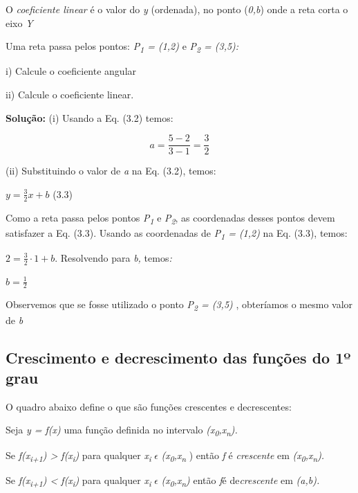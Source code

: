 \begin{caixa}
O \textit{coeficiente linear} é o valor do \textit{y }(ordenada), no ponto (\textit{0,b}) onde a reta corta o eixo \textit{Y}  
\end{caixa}

\begin{texemplo}
Uma reta passa pelos pontos: \textit{P\textsubscript{1} = (1,2) }e\textit{ P\textsubscript{2} = (3,5):}

i) Calcule o coeficiente angular

ii) Calcule o coeficiente linear.

\textbf{Solução: }(i) Usando a Eq. (3.2) temos:

 \[ a=\frac{5-2}{3-1}=\frac{3}{2} \] 

(ii) Substituindo o valor de \textit{a} na Eq. (3.2), temos:

 \( y=\frac{3}{2}x+b \) \tab (3.3)

Como a reta passa pelos pontos \textit{P\textsubscript{1 }}e\textit{ P\textsubscript{2}}, as coordenadas desses pontos devem satisfazer a Eq. (3.3). Usando as coordenadas de\textit{ P\textsubscript{1} = (1,2) }na Eq. (3.3), temos:

\textit{\( 2=\frac{3}{2} \cdot 1+b \)}. Resolvendo para\textit{ b, }temos\textit{:}

\( b=\frac{1}{2} \)  

Observemos que se fosse utilizado o ponto \textit{P\textsubscript{2} = (3,5)} , obteríamos o mesmo valor de \textit{b}  \qedsymbol{}
\end{texemplo}

\subsection{Crescimento e decrescimento das funções do 1º grau}

O quadro abaixo define o que são funções crescentes e decrescentes:

\begin{caixa}
Seja \textit{y = f(x)} uma função definida no intervalo \textit{(x\textsubscript{0},x\textsubscript{n}).} 

Se \textit{f(x\textsubscript{i+1}) > f(x\textsubscript{i})} para qualquer \textit{x\textsubscript{i }} $ \epsilon $  \textit{(x\textsubscript{0},x\textsubscript{n}} ) então \textit{f} é \textit{crescente} em \textit{(x\textsubscript{0},x\textsubscript{n}).}

Se \textit{f(x\textsubscript{i+1}) <  f(x\textsubscript{i})} para qualquer \textit{x\textsubscript{i }} $ \epsilon $  \textit{(x\textsubscript{0},x\textsubscript{n})} então \textit{f}é  de\textit{crescente} em \textit{(a,b).}
\end{caixa}


